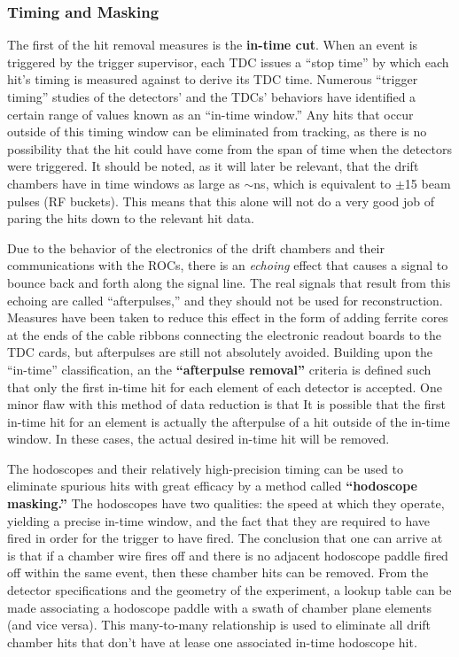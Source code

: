 \subsubsection{Timing and Masking}

The first of the hit removal measures is the \textbf{in-time cut}. When an event is triggered by the trigger supervisor, each TDC issues a ``stop time'' by which each hit's timing is measured against to derive its TDC time. Numerous ``trigger timing'' studies of the detectors' and the TDCs' behaviors have identified a certain range of values known as an ``in-time window.'' Any hits that occur outside of this timing window can be eliminated from tracking, as there is no possibility that the hit could have come from the span of time when the detectors were triggered. It should be noted, as it will later be relevant, that the drift chambers have in time windows as large as $\sim$\unit[600]{ns}, which is equivalent to $\pm$15 beam pulses (RF buckets). This means that this alone will not do a very good job of paring the hits down to the relevant hit data.

Due to the behavior of the electronics of the drift chambers and their communications with the ROCs, there is an \emph{echoing} effect that causes a signal to bounce back and forth along the signal line. The real signals that result from this echoing are called ``afterpulses,'' and they should not be used for reconstruction. Measures have been taken to reduce this effect in the form of adding ferrite cores at the ends of the cable ribbons connecting the electronic readout boards to the TDC cards, but afterpulses are still not absolutely avoided. Building upon the ``in-time'' classification, an the \textbf{``afterpulse removal''} criteria is defined such that only the first in-time hit for each element of each detector is accepted. One minor flaw with this method of data reduction is that It is possible that the first in-time hit for an element is actually the afterpulse of a hit outside of the in-time window. In these cases, the actual desired in-time hit will be removed.

The hodoscopes and their relatively high-precision timing can be used to eliminate spurious hits with great efficacy by a method called \textbf{``hodoscope masking.''} The hodoscopes have two qualities: the speed at which they operate, yielding a precise in-time window, and the fact that they are required to have fired in order for the trigger to have fired. The conclusion that one can arrive at is that if a chamber wire fires off and there is no adjacent hodoscope paddle fired off within the same event, then these chamber hits can be removed. From the detector specifications and the geometry of the experiment, a lookup table can be made associating a hodoscope paddle with a swath of chamber plane elements (and vice versa). This many-to-many relationship is used to eliminate all drift chamber hits that don't have at lease one associated in-time hodoscope hit.

